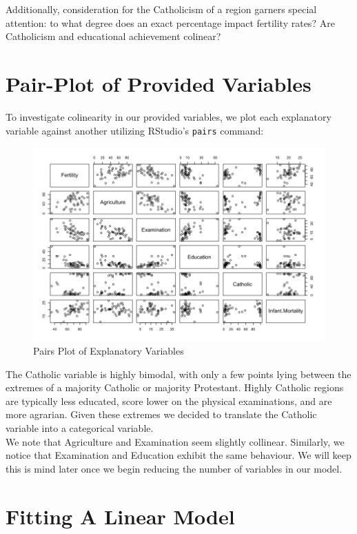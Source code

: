 \documentclass[preprint,12pt]{elsarticle}
\begin{document}
\noindent Additionally, consideration for the Catholicism of a region garners special attention: to what degree does an exact percentage impact fertility rates? Are Catholicism and educational achievement colinear? 

\section*{Pair-Plot of Provided Variables}

\noindent To investigate colinearity in our provided variables, we plot each explanatory variable against another utilizing RStudio's \texttt{pairs} command:

\begin{figure}[h]
\centering\includegraphics[width=0.8\linewidth]{Pairs}
\caption{Pairs Plot of Explanatory Variables}
\end{figure}


\noindent The Catholic variable is highly bimodal, with only a few points lying between the extremes of a majority Catholic or majority Protestant. Highly Catholic regions are typically less educated, score lower on the physical examinations, and are more agrarian. Given these extremes we decided to translate the Catholic variable into a categorical variable.\\

\noindent We note that Agriculture and Examination seem  slightly collinear. Similarly, we notice that Examination and Education exhibit the same behaviour. We will keep this is mind later once we begin reducing the number of variables in our model.

\section*{Fitting A Linear Model}
\end{document}
